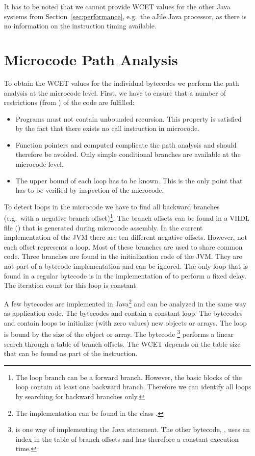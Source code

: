 It has to be noted that we cannot provide WCET values for the other
Java systems from Section~\ref{sec:performance}, e.g.\ the aJile
Java processor, as there is no information on the instruction timing
available.


\section{Microcode Path Analysis}

To obtain the WCET values for the individual bytecodes we perform
the path analysis at the microcode level. First, we have to ensure
that a number of restrictions (from \cite{pusch:maxt:jnl}) of the
code are fulfilled:
%
\begin{itemize}
    \item Programs must not contain unbounded recursion. This property
    is satisfied by the fact that there exists no call instruction in
    microcode.
    \item Function pointers and computed  complicate the
    path analysis and should therefore be avoided. Only simple conditional
    branches are available at the microcode level.
    \item The upper bound of each loop has to be known. This is the only
    point that has to be verified by inspection of the microcode.
\end{itemize}
%
To detect loops in the microcode we have to find all backward
branches (e.g.\ with a negative branch offset)\footnote{The loop
branch can be a forward branch. However, the basic blocks of the
loop contain at least one backward branch. Therefore we can identify
all loops by searching for backward branches only.}. The branch
offsets can be found in a VHDL file () that is
generated during microcode assembly. In the current implementation
of the JVM there are ten different negative offsets. However, not
each offset represents a loop. Most of these branches are used to
share common code. Three branches are found in the initialization
code of the JVM. They are not part of a bytecode implementation and
can be ignored. The only loop that is found in a regular bytecode is
in the implementation of  to perform a fixed delay. The
iteration count for this loop is constant.

A few bytecodes are implemented in Java\footnote{The implementation
can be found in the class .} and can be
analyzed in the same way as application code. The bytecodes
 and  contain a constant loop. The bytecodes
 and  contain loops to initialize (with
zero values) new objects or arrays. The loop is bound by the size of
the object or array. The bytecode
\footnote{ is one way of
implementing the Java  statement. The other
bytecode, , uses an index in the table of
branch offsets and has therefore a constant execution time.}
performs a linear search through a table of branch offsets. The WCET
depends on the table size that can be found as part of the
instruction.

